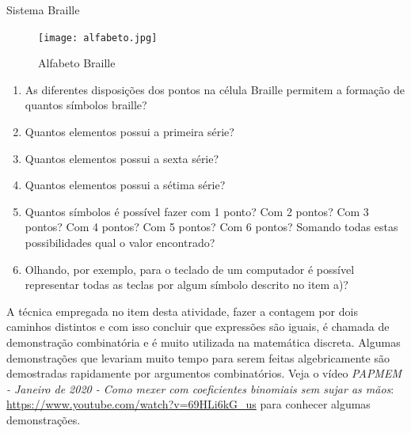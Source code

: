 \begin{task}{Sistema Braille}
\begin{itemize}
\end{itemize}

\begin{figure}[H]
\centering

\texttt{[image: alfabeto.jpg]}
\caption{Alfabeto Braille}
\end{figure}

 
 
 \begin{enumerate}
     \item As diferentes disposições dos pontos na célula Braille permitem a formação de quantos símbolos braille?
     \item Quantos elementos possui a primeira série?
     \item Quantos elementos possui a sexta série?
     \item Quantos elementos possui a sétima série?
     \item Quantos símbolos é possível fazer com 1 ponto? Com 2 pontos? Com 3 pontos? Com 4 pontos? Com 5 pontos? Com 6 pontos? Somando todas estas possibilidades qual o valor encontrado?
      \item Olhando, por exemplo, para o teclado de um computador é possível representar todas as teclas por algum símbolo descrito no item a)? 
     
 \end{enumerate}

\end{task}

\begin{knowledge}
A técnica empregada no item  desta atividade, fazer a contagem por dois caminhos distintos e com isso concluir que expressões são iguais, é chamada de demonstração combinatória e é muito utilizada na matemática discreta. Algumas demonstrações que levariam muito tempo para serem feitas algebricamente são demostradas rapidamente por argumentos combinatórios. Veja o vídeo \textit{ PAPMEM - Janeiro de 2020 - Como mexer com coeficientes binomiais sem sujar as mãos}: \url{https://www.youtube.com/watch?v=69HLi6kG_us} para conhecer algumas demonstrações.
\end{knowledge}

